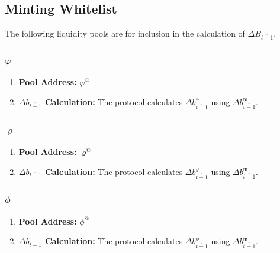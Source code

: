 \documentclass[class=article, crop=false]{standalone}
\begin{document}

\subsection{Minting Whitelist}

The following liquidity pools are  for inclusion in the calculation of $\Delta B_{\overline{t-1}}$.


\subsubsection{$\varphi$}

    \begin{enumerate}
        \item \textbf{Pool Address:} $\varphi^{@}$
            
        \item \textbf{$\Delta b_{\overline{t-1}}$ Calculation:} The protocol calculates $\Delta b_{\overline{t-1}}^{\varphi}$ using $\Delta b_{\overline{t-1}}^{\mathfrak{w}}$.
    \end{enumerate}


\subsubsection{$\varrho$}

    \begin{enumerate}
        \item \textbf{Pool Address:} $\varrho^{@}$
            
        \item \textbf{$\Delta b_{\overline{t-1}}$ Calculation:} The protocol calculates $\Delta b_{\overline{t-1}}^{\varrho}$ using $\Delta b_{\overline{t-1}}^{\mathfrak{w}}$.
    \end{enumerate}


\subsubsection{$\phi$}

    \begin{enumerate}
        \item \textbf{Pool Address:} $\phi^{@}$
            
        \item \textbf{$\Delta b_{\overline{t-1}}$ Calculation:} The protocol calculates $\Delta b_{\overline{t-1}}^{\phi}$ using $\Delta b_{\overline{t-1}}^{\mathfrak{w}}$.
    \end{enumerate}
\end{document}
